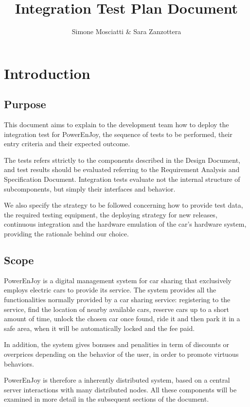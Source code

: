 \documentclass[11pt]{article} %
\title{Integration	Test Plan Document}
\author{Simone Mosciatti \& Sara Zanzottera}
\newcommand{\pe}{PowerEnJoy }
\newcommand{\pecomma}{PowerEnJoy, }
\begin{document}
\maketitle
\newpage
\tableofcontents
\newpage


\section{Introduction}

\subsection{Purpose}

This document aims to explain to the development team how to deploy the integration test for \pecomma the sequence of tests to be performed, their entry criteria and their expected outcome. 

The tests refers sttrictly to the components described in the Design Document, and test results should be evaluated referring to the Requirement Analysis and Specification Document. Integration tests evaluate not the internal structure of subcomponents, but simply their interfaces and behavior.

We also specify the strategy to be followed concerning how to provide test data, the required testing equipment, the deploying strategy for new releases, continuous integration and the hardware emulation of the car's hardware system, providing the rationale behind our choice.

\subsection{Scope}

\pe is a digital management system for car sharing that exclusively employs electric cars to provide its service. The system provides all the functionalities normally provided by a car sharing service: registering to the service, find the location of nearby available cars, reserve cars up to a short amount of time, unlock the chosen car once found, ride it and then park it in a safe area, when it will be automatically locked and the fee paid.

In addition, the system gives bonuses and penalities in term of discounts or overprices depending on the behavior of the user, in order to promote virtuous behaviors.

\pe is therefore a inherently distributed system, based on a central server interactions with many distributed nodes. All these components will be examined in more detail in the subsequent sections of the document.
\end{document}
